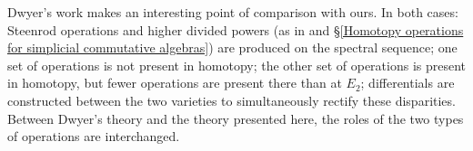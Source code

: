 \documentclass[11pt]{amsart} \renewcommand{\baselinestretch}{1.2}
\theoremstyle{plain}
\theoremstyle{definition}
\renewcommand{\to}{\longrightarrow}
\newcommand{\Sq}{\mathrm{Sq}}
\begin{document}
\begin{second quadrant homotopy sseq operations}
Dwyer's work makes an interesting point of comparison with ours. In both cases: Steenrod operations and higher divided powers (as in \cite{DwyerHigherDividedSquares.pdf} and \S\ref{Homotopy operations for simplicial commutative algebras}) are produced on the spectral sequence; one set of operations is not present in homotopy;  the other set of operations is present in homotopy, but fewer operations are present there than at $E_2$; differentials are constructed between the two varieties to simultaneously rectify these disparities. Between Dwyer's theory and the theory presented here, the roles of the two types of operations are interchanged.


\end{second quadrant homotopy sseq operations}
\end{document}

